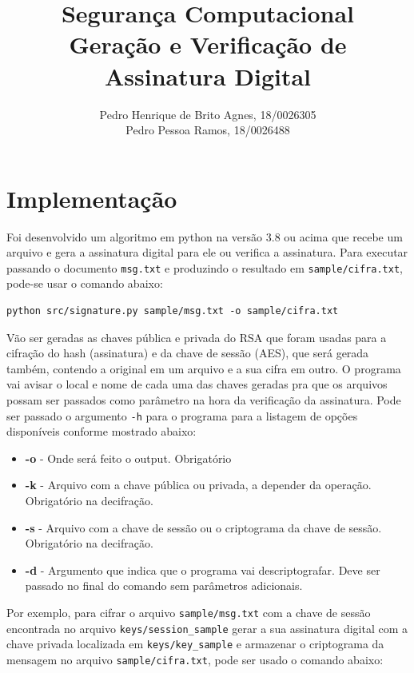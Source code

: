 \documentclass[12pt]{article}
\title{\textbf{Segurança Computacional\\ \Large{Geração e Verificação de Assinatura Digital}}}
\author{Pedro Henrique de Brito Agnes, 18/0026305
\\ Pedro Pessoa Ramos, 18/0026488
}
\affil{Dep. Ciência da Computação - Universidade de Brasília (UnB) \vspace{-2ex}}
\date{}
\begin{document}
\maketitle

\section{Implementação}

Foi desenvolvido um algoritmo em python na versão 3.8 ou acima que recebe um arquivo e gera a assinatura digital para ele ou verifica a assinatura. Para executar passando o documento \texttt{msg.txt} e produzindo o resultado em \texttt{sample/cifra.txt}, pode-se usar o comando abaixo:

\begin{lstlisting}
python src/signature.py sample/msg.txt -o sample/cifra.txt
\end{lstlisting}

Vão ser geradas as chaves pública e privada do RSA que foram usadas para a cifração do hash (assinatura) e da chave de sessão (AES), que será gerada também, contendo a original em um arquivo e a sua cifra em outro. O programa vai avisar o local e nome de cada uma das chaves geradas pra que os arquivos possam ser passados como parâmetro na hora da verificação da assinatura. Pode ser passado o argumento \texttt{-h} para o programa para a listagem de opções disponíveis conforme mostrado abaixo:

\begin{itemize}
    \item \textbf{-o} - Onde será feito o output. Obrigatório
    \item \textbf{-k} - Arquivo com a chave pública ou privada, a depender da operação. Obrigatório na decifração.
    \item \textbf{-s} - Arquivo com a chave de sessão ou o criptograma da chave de sessão. Obrigatório na decifração.
    \item \textbf{-d} - Argumento que indica que o programa vai descriptografar. Deve ser passado no final do comando sem parâmetros adicionais.
\end{itemize}

Por exemplo, para cifrar o arquivo \texttt{sample/msg.txt} com a chave de sessão encontrada no arquivo \texttt{keys/session\_sample} gerar a sua assinatura digital com a chave privada localizada em \texttt{keys/key\_sample} e armazenar o criptograma da mensagem no arquivo \texttt{sample/cifra.txt}, pode ser usado o comando abaixo:
\end{document}

